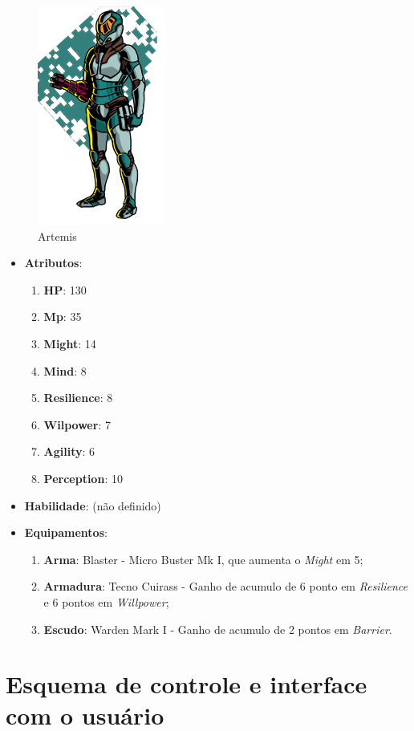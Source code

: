 \documentclass[11pt]{article} %
\begin{document}
\begin{figure}[!htp]
\centering
\includegraphics[scale=0.5]{res/characters/Artemis.png}
\caption{Artemis}
\label{Artemis}
\end{figure}

\begin{itemize}
\item \textbf{Atributos}:
  \begin{enumerate}
    \item \textbf{HP}: 130
    \item \textbf{Mp}: 35
    \item \textbf{Might}: 14
    \item \textbf{Mind}: 8
    \item \textbf{Resilience}: 8
    \item \textbf{Wilpower}: 7
    \item \textbf{Agility}: 6
    \item \textbf{Perception}: 10
  \end{enumerate}
\item \textbf{Habilidade}: (não definido)
\item \textbf{Equipamentos}:
  \begin{enumerate}
    \item \textbf{Arma}: Blaster - Micro Buster Mk I, que aumenta o \textit{Might} em 5;
    \item \textbf{Armadura}: Tecno Cuirass - Ganho de acumulo de 6 ponto em \textit{Resilience} e 6 pontos em \textit{Willpower};
    \item \textbf{Escudo}: Warden Mark I - Ganho de acumulo de 2 pontos em \textit{Barrier}.
  \end{enumerate}
\end{itemize}

\section{Esquema de controle e interface com o usuário}
\end{document}
